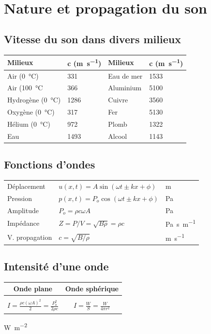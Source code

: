 \section{Nature et propagation du son}
\subsection{Vitesse du son dans divers milieux}
\begin{tabular}{ll|ll}
    Milieux & c (\si{\meter\per\second}) & Milieux & c (\si{\meter\per\second})\\\hline
    Air (\SI{0}{\degreeCelsius}) & 331 & Eau de mer & 1533\\
    Air (\SI{100}{\degreeCelsius} & 366 & Aluminium & 5100\\
    Hydrogène (\SI{0}{\degreeCelsius}) & 1286 & Cuivre & 3560\\
    Oxygène (\SI{0}{\degreeCelsius}) & 317 & Fer & 5130\\
    Hélium (\SI{0}{\degreeCelsius}) & 972 & Plomb & 1322\\
    Eau & 1493 & Alcool & 1143
\end{tabular}

\subsection{Fonctions d'ondes}
\begin{tabular}{lll}
    Déplacement &  \(u(x,t)=A\sin (\omega t \pm kx+\phi)\) & \si{\meter}\\[5pt]
    Pression & \(p(x,t)=P_{o}\cos(\omega t \pm kx+\phi)\) & \si{\pascal}\\[5pt]
    Amplitude & \(P_{o}=\rho c \omega A\) & \si{\pascal}\\[5pt]
    Impédance & \(Z=P/V=\sqrt{B\rho}=\rho c\) & \si{\pascal\second\per\meter}\\[5pt]
    V. propagation & \(c=\sqrt{B/\rho} \) & \si{\meter\per\second}
\end{tabular}

\subsection{Intensité d'une onde}
\begin{center}
\begin{tabular}{c|c}
    Onde plane & Onde sphérique \\\hline\\[-1em]
    \(I=\frac{\rho c (\omega A)^2}{2}=\frac{P_{o}^{2}}{2\rho c}\) & \(I=\frac{W}{S}=\frac{W}{4\pi r^{2}}\)
\end{tabular}
\hspace{1em}\si{\watt\per\meter\squared}
\end{center}

